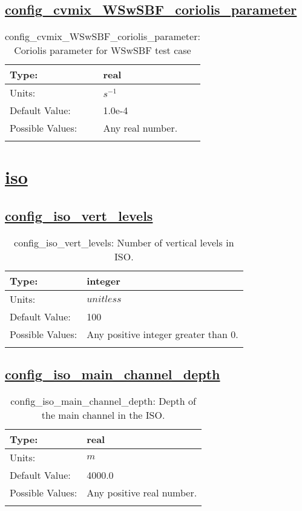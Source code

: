 \subsection[config\_cvmix\_WSwSBF\_coriolis\_parameter]{\hyperref[sec:nm_tab_cvmix_WSwSBF]{config\_cvmix\_WSwSBF\_coriolis\_parameter}}
\label{subsec:nm_sec_config_cvmix_WSwSBF_coriolis_parameter}
\begin{center}
\begin{longtable}{| p{2.0in} || p{4.0in} |}
    \hline
    Type: & real \\
    \hline
    Units: & $s^{-1}$ \\
    \hline
    Default Value: & 1.0e-4 \\
    \hline
    Possible Values: & Any real number. \\
    \hline
    \caption{config\_cvmix\_WSwSBF\_coriolis\_parameter: Coriolis parameter for WSwSBF test case}
\end{longtable}
\end{center}
\section[iso]{\hyperref[sec:nm_tab_iso]{iso}}
\label{sec:nm_sec_iso}
\subsection[config\_iso\_vert\_levels]{\hyperref[sec:nm_tab_iso]{config\_iso\_vert\_levels}}
\label{subsec:nm_sec_config_iso_vert_levels}
\begin{center}
\begin{longtable}{| p{2.0in} || p{4.0in} |}
    \hline
    Type: & integer \\
    \hline
    Units: & $unitless$ \\
    \hline
    Default Value: & 100 \\
    \hline
    Possible Values: & Any positive integer greater than 0. \\
    \hline
    \caption{config\_iso\_vert\_levels: Number of vertical levels in ISO.}
\end{longtable}
\end{center}
\subsection[config\_iso\_main\_channel\_depth]{\hyperref[sec:nm_tab_iso]{config\_iso\_main\_channel\_depth}}
\label{subsec:nm_sec_config_iso_main_channel_depth}
\begin{center}
\begin{longtable}{| p{2.0in} || p{4.0in} |}
    \hline
    Type: & real \\
    \hline
    Units: & $m$ \\
    \hline
    Default Value: & 4000.0 \\
    \hline
    Possible Values: & Any positive real number. \\
    \hline
    \caption{config\_iso\_main\_channel\_depth: Depth of the main channel in the ISO.}
\end{longtable}
\end{center}
